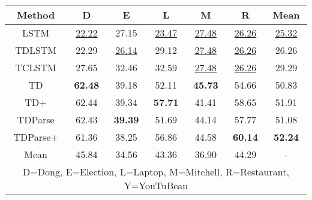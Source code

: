 \begin{tabular}{|c|c|c|c|c|c|c|}
\hline
Method  &   D &  E &  L &  M &  R  &   Mean \\
\hline
LSTM &  \underline{22.22} &     27.15 &   \underline{23.47} &     \underline{27.48} &       \underline{26.26} &  \underline{25.32} \\
\hline
TDLSTM &  22.29 &     \underline{26.14} &   29.12 &     \underline{27.48} &       \underline{26.26} &  26.26 \\
\hline
TCLSTM &  27.65 &     32.46 &   32.59 &     \underline{27.48} &       \underline{26.26} &  29.29 \\
\hline
TD &  \textbf{62.48} &     39.18 &   52.11 &     \textbf{45.73} &       54.66 &  50.83 \\
\hline
TD+ &  62.44 &     39.34 &   \textbf{57.71} &     41.41 &       58.65 &  51.91 \\
\hline
TDParse &  62.43 &     \textbf{39.39} &   51.69 &     44.14 &       57.77 &  51.08 \\
\hline
TDParse+ &  61.36 &     38.25 &   56.86 &     44.58 &       \textbf{60.14} &  \textbf{52.24} \\
\hline
Mean &  45.84 &     34.56 &   43.36 &     36.90 &       44.29 &  - \\
\hline
\multicolumn{7}{|p{9.5cm}|}{\centering D=Dong, E=Election, L=Laptop, M=Mitchell, R=Restaurant, Y=YouTuBean}\\
\hline
\end{tabular}